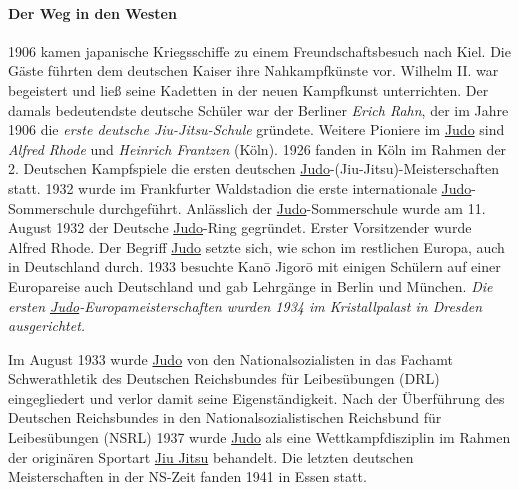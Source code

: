 \documentclass[justified, a4paper, notitlepage, captions=tableheading, nobib]{tufte-handout}
\begin{document}
\paragraph{Der Weg in den Westen}
\label{sec:org30128f1}
1906 kamen japanische Kriegsschiffe zu einem Freundschaftsbesuch nach Kiel. Die Gäste führten dem deutschen Kaiser ihre Nahkampfkünste vor. Wilhelm II. war begeistert und ließ seine Kadetten in der neuen Kampfkunst unterrichten. Der damals bedeutendste deutsche Schüler war der Berliner \emph{Erich Rahn}, der im Jahre 1906 die \emph{erste deutsche Jiu-Jitsu-Schule} gründete. Weitere Pioniere im \hyperref[org6f56467]{Judo} sind \emph{Alfred Rhode} und \emph{Heinrich Frantzen} (Köln). 1926 fanden in Köln im Rahmen der 2. Deutschen Kampfspiele die ersten deutschen \hyperref[org6f56467]{Judo}-(Jiu-Jitsu)-Meisterschaften statt. 1932 wurde im Frankfurter Waldstadion die erste internationale \hyperref[org6f56467]{Judo}-Sommerschule durchgeführt. Anlässlich der \hyperref[org6f56467]{Judo}-Sommerschule wurde am 11. August 1932 der Deutsche \hyperref[org6f56467]{Judo}-Ring gegründet. Erster Vorsitzender wurde Alfred Rhode. Der Begriff \hyperref[org6f56467]{Judo} setzte sich, wie schon im restlichen Europa, auch in Deutschland durch. 1933 besuchte Kanō Jigorō mit einigen Schülern auf einer Europareise auch Deutschland und gab Lehrgänge in Berlin und München. \emph{Die ersten \hyperref[org6f56467]{Judo}-Europameisterschaften wurden 1934 im Kristallpalast in Dresden ausgerichtet.}

Im August 1933 wurde \hyperref[org6f56467]{Judo} von den Nationalsozialisten in das Fachamt Schwerathletik des Deutschen Reichsbundes für Leibesübungen (DRL) eingegliedert und verlor damit seine Eigenständigkeit. Nach der Überführung des Deutschen Reichsbundes in den Nationalsozialistischen Reichsbund für Leibesübungen (NSRL) 1937 wurde \hyperref[org6f56467]{Judo} als eine Wettkampfdisziplin im Rahmen der originären Sportart \hyperref[org0aec6dd]{Jiu Jitsu} behandelt. Die letzten deutschen Meisterschaften in der NS-Zeit fanden 1941 in Essen statt.
\end{document}
